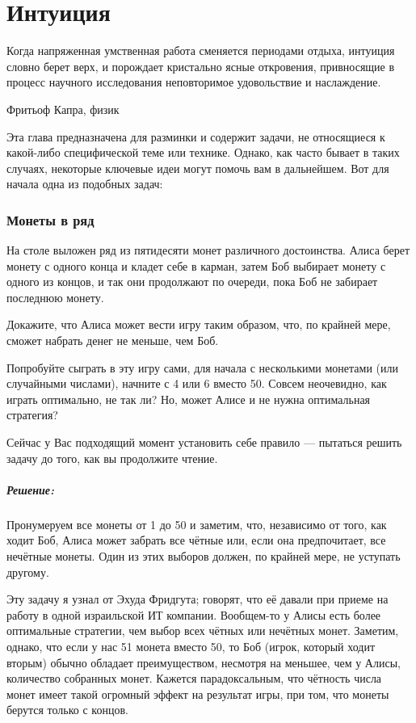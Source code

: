 \chapter*{Интуиция}
 

\epigraph{Когда напряженная умственная работа сменяется периодами отдыха, интуиция словно берет верх, и порождает кристально ясные откровения, привносящие в процесс научного исследования неповторимое удовольствие и наслаждение.}{Фритьоф Капра, физик}

Эта глава предназначена для разминки и содержит задачи, не относящиеся к какой-либо специфической теме или технике.
Однако, как часто бывает в таких случаях, некоторые ключевые идеи могут помочь вам в дальнейшем.
 Вот для начала одна из подобных задач:

\subsection*{Монеты в ряд} %

На столе выложен ряд из пятидесяти монет различного достоинства.
Алиса берет монету с одного конца и кладет себе в карман, затем Боб выбирает монету с одного из концов, и так они продолжают по очереди, пока Боб не забирает последнюю монету.

Докажите, что Алиса может вести игру таким образом, что, по крайней мере, сможет набрать денег не меньше, чем Боб.

\medskip

Попробуйте сыграть в эту игру сами, для начала с несколькими монетами (или случайными числами), начните с 4 или 6 вместо 50.
Совсем неочевидно, как играть оптимально, не так ли?
Но, может Алисе и не нужна оптимальная стратегия? 

Сейчас у Вас подходящий момент установить себе правило --- пытаться решить задачу до того, как вы продолжите чтение.

\paragraph{Решение:}
Пронумеруем все монеты от 1 до 50 и заметим, что, независимо от того, как ходит Боб, Алиса может забрать все чётные или, если она предпочитает, все нечётные монеты.
Один из этих выборов должен, по крайней мере, не уступать другому.
\heart

Эту задачу я узнал от Эхуда Фридгута;
говорят, что её давали при приеме на работу в одной израильской ИТ компании.
Вообщем-то у Алисы есть более оптимальные стратегии, чем выбор всех чётных или нечётных монет.
Заметим, однако, что если у нас 51 монета вместо 50, то Боб (игрок, который ходит вторым) обычно обладает преимуществом, несмотря на меньшее, чем у Алисы, количество собранных монет.
Кажется парадоксальным, что чётность числа монет имеет такой огромный эффект на результат игры, при том, что монеты берутся только с концов.

